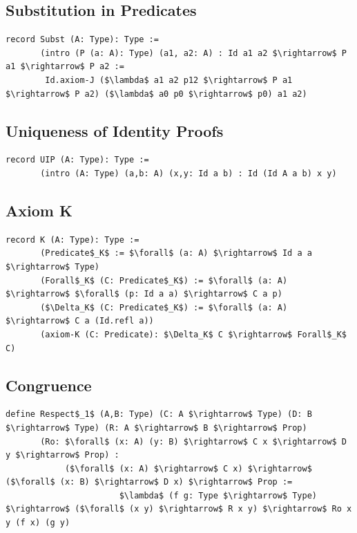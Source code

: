 \documentclass[11pt,oneside]{article}
\begin{document}
\subsection{Substitution in Predicates}

\begin{lstlisting}[mathescape=true]
record Subst (A: Type): Type :=
       (intro (P (a: A): Type) (a1, a2: A) : Id a1 a2 $\rightarrow$ P a1 $\rightarrow$ P a2 :=
        Id.axiom-J ($\lambda$ a1 a2 p12 $\rightarrow$ P a1 $\rightarrow$ P a2) ($\lambda$ a0 p0 $\rightarrow$ p0) a1 a2)
\end{lstlisting}

\subsection{Uniqueness of Identity Proofs}

\begin{lstlisting}[mathescape=true]
record UIP (A: Type): Type :=
       (intro (A: Type) (a,b: A) (x,y: Id a b) : Id (Id A a b) x y)
\end{lstlisting}

\subsection{Axiom K}

\begin{lstlisting}[mathescape=true]
record K (A: Type): Type :=
       (Predicate$_K$ := $\forall$ (a: A) $\rightarrow$ Id a a $\rightarrow$ Type)
       (Forall$_K$ (C: Predicate$_K$) := $\forall$ (a: A) $\rightarrow$ $\forall$ (p: Id a a) $\rightarrow$ C a p)
       ($\Delta_K$ (C: Predicate$_K$) := $\forall$ (a: A) $\rightarrow$ C a (Id.refl a))
       (axiom-K (C: Predicate): $\Delta_K$ C $\rightarrow$ Forall$_K$ C)
\end{lstlisting}

\subsection{Congruence}

\begin{lstlisting}[mathescape=true]
define Respect$_1$ (A,B: Type) (C: A $\rightarrow$ Type) (D: B $\rightarrow$ Type) (R: A $\rightarrow$ B $\rightarrow$ Prop)
       (Ro: $\forall$ (x: A) (y: B) $\rightarrow$ C x $\rightarrow$ D y $\rightarrow$ Prop) :
            ($\forall$ (x: A) $\rightarrow$ C x) $\rightarrow$ ($\forall$ (x: B) $\rightarrow$ D x) $\rightarrow$ Prop :=
                       $\lambda$ (f g: Type $\rightarrow$ Type) $\rightarrow$ ($\forall$ (x y) $\rightarrow$ R x y) $\rightarrow$ Ro x y (f x) (g y)
\end{lstlisting}
\end{document}
